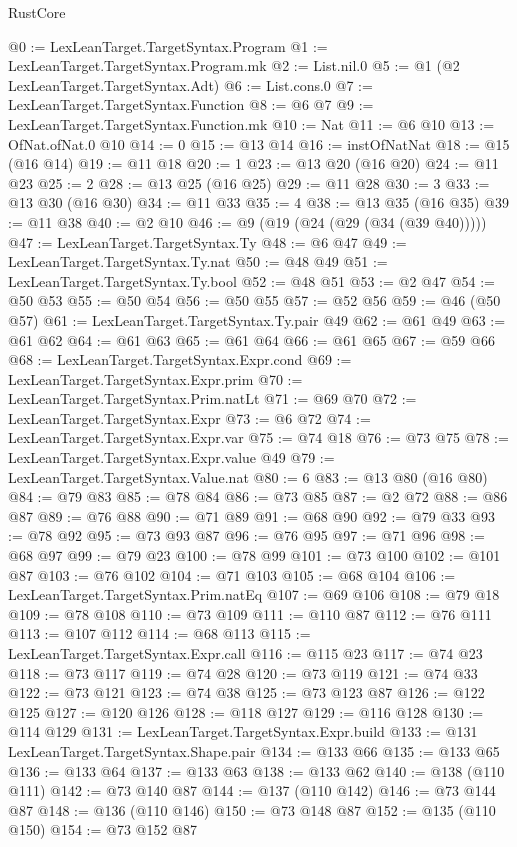 \begin{lexlean}{RustCore}
\begin{coremodule}
@0 := LexLeanTarget.TargetSyntax.Program
@1 := LexLeanTarget.TargetSyntax.Program.mk
@2 := List.nil.{0}
@5 := @1 (@2 LexLeanTarget.TargetSyntax.Adt)
@6 := List.cons.{0}
@7 := LexLeanTarget.TargetSyntax.Function
@8 := @6 @7
@9 := LexLeanTarget.TargetSyntax.Function.mk
@10 := Nat
@11 := @6 @10
@13 := OfNat.ofNat.{0} @10
@14 := 0
@15 := @13 @14
@16 := instOfNatNat
@18 := @15 (@16 @14)
@19 := @11 @18
@20 := 1
@23 := @13 @20 (@16 @20)
@24 := @11 @23
@25 := 2
@28 := @13 @25 (@16 @25)
@29 := @11 @28
@30 := 3
@33 := @13 @30 (@16 @30)
@34 := @11 @33
@35 := 4
@38 := @13 @35 (@16 @35)
@39 := @11 @38
@40 := @2 @10
@46 := @9 (@19 (@24 (@29 (@34 (@39 @40)))))
@47 := LexLeanTarget.TargetSyntax.Ty
@48 := @6 @47
@49 := LexLeanTarget.TargetSyntax.Ty.nat
@50 := @48 @49
@51 := LexLeanTarget.TargetSyntax.Ty.bool
@52 := @48 @51
@53 := @2 @47
@54 := @50 @53
@55 := @50 @54
@56 := @50 @55
@57 := @52 @56
@59 := @46 (@50 @57)
@61 := LexLeanTarget.TargetSyntax.Ty.pair @49
@62 := @61 @49
@63 := @61 @62
@64 := @61 @63
@65 := @61 @64
@66 := @61 @65
@67 := @59 @66
@68 := LexLeanTarget.TargetSyntax.Expr.cond
@69 := LexLeanTarget.TargetSyntax.Expr.prim
@70 := LexLeanTarget.TargetSyntax.Prim.natLt
@71 := @69 @70
@72 := LexLeanTarget.TargetSyntax.Expr
@73 := @6 @72
@74 := LexLeanTarget.TargetSyntax.Expr.var
@75 := @74 @18
@76 := @73 @75
@78 := LexLeanTarget.TargetSyntax.Expr.value @49
@79 := LexLeanTarget.TargetSyntax.Value.nat
@80 := 6
@83 := @13 @80 (@16 @80)
@84 := @79 @83
@85 := @78 @84
@86 := @73 @85
@87 := @2 @72
@88 := @86 @87
@89 := @76 @88
@90 := @71 @89
@91 := @68 @90
@92 := @79 @33
@93 := @78 @92
@95 := @73 @93 @87
@96 := @76 @95
@97 := @71 @96
@98 := @68 @97
@99 := @79 @23
@100 := @78 @99
@101 := @73 @100
@102 := @101 @87
@103 := @76 @102
@104 := @71 @103
@105 := @68 @104
@106 := LexLeanTarget.TargetSyntax.Prim.natEq
@107 := @69 @106
@108 := @79 @18
@109 := @78 @108
@110 := @73 @109
@111 := @110 @87
@112 := @76 @111
@113 := @107 @112
@114 := @68 @113
@115 := LexLeanTarget.TargetSyntax.Expr.call
@116 := @115 @23
@117 := @74 @23
@118 := @73 @117
@119 := @74 @28
@120 := @73 @119
@121 := @74 @33
@122 := @73 @121
@123 := @74 @38
@125 := @73 @123 @87
@126 := @122 @125
@127 := @120 @126
@128 := @118 @127
@129 := @116 @128
@130 := @114 @129
@131 := LexLeanTarget.TargetSyntax.Expr.build
@133 := @131 LexLeanTarget.TargetSyntax.Shape.pair
@134 := @133 @66
@135 := @133 @65
@136 := @133 @64
@137 := @133 @63
@138 := @133 @62
@140 := @138 (@110 @111)
@142 := @73 @140 @87
@144 := @137 (@110 @142)
@146 := @73 @144 @87
@148 := @136 (@110 @146)
@150 := @73 @148 @87
@152 := @135 (@110 @150)
@154 := @73 @152 @87

\end{coremodule}
\end{lexlean}
